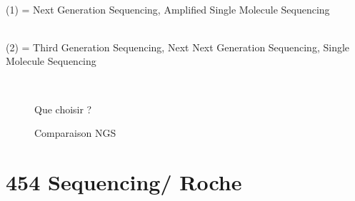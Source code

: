 \documentclass[a4paper]{article}
\begin{document}
~~\\

(1) = Next Generation Sequencing, Amplified Single Molecule Sequencing

~~\\

(2) = Third Generation Sequencing, Next Next Generation Sequencing, Single Molecule Sequencing

~~\\


\begin{figure}[!h]
\caption{Que choisir ?}
\end{figure}

\begin{figure}[!h]
\caption{Comparaison NGS}
\end{figure}


\section{454 Sequencing/ Roche}
 
\end{document}
